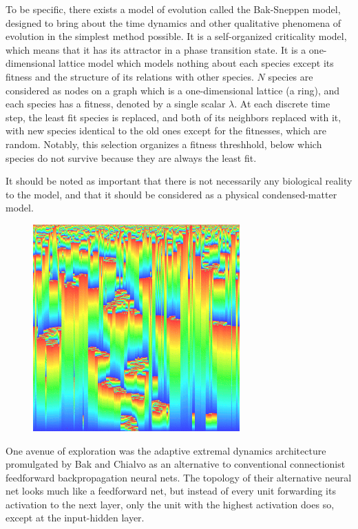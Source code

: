 \documentclass[12pt]{article}
\begin{document}
To be specific, there exists a model of evolution called the Bak-Sneppen model, designed to bring about the time dynamics and other qualitative phenomena of evolution in the simplest method possible. It is a self-organized criticality model, which means that it has its attractor in a phase transition state. It is a one-dimensional lattice model which models nothing about each species except its fitness and the structure of its relations with other species. $N$ species are considered as nodes on a graph which is a one-dimensional lattice (a ring), and each species has a fitness, denoted by a single scalar $\lambda$. At each discrete time step, the least fit species is replaced, and both of its neighbors replaced with it, with new species identical to the old ones except for the fitnesses, which are random. Notably, this selection organizes a fitness threshhold, below which species do not survive because they are always the least fit.

It should be noted as important that there is not necessarily any biological reality to the model, and that it should be considered as a physical condensed-matter model.

\begin{figure}
  \includegraphics{bak_sneppen}
\end{figure}

One avenue of exploration was the adaptive extremal dynamics architecture promulgated by Bak and Chialvo as an alternative to conventional connectionist feedforward backpropagation neural nets. The topology of their alternative neural net looks much like a feedforward net, but instead of every unit forwarding its activation to the next layer, only the unit with the highest activation does so, except at the input-hidden layer.
\end{document}
